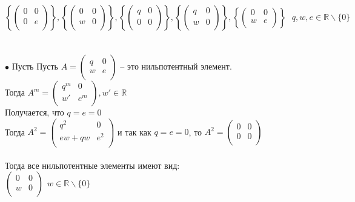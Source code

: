 \documentclass[12pt,a4paper]{scrartcl}
\begin{document}
	$\left\{ \begin{pmatrix}
	0&0\\
	0&e\\
	\end{pmatrix} \right\}, \left\{ \begin{pmatrix}
	0&0\\
	w&0\\
	\end{pmatrix} \right\}, \left\{ \begin{pmatrix}
	q&0\\
	0&0\\
	\end{pmatrix} \right\}, \left\{ \begin{pmatrix}
	q&0\\
	w&0\\
	\end{pmatrix} \right\}, \left\{ \begin{pmatrix}
	0&0\\
	w&e\\
	\end{pmatrix} \right\}~~~ q, w, e \in \mathbb{R}\backslash \{0\}$\\
	\\
	\\
	$\bullet$ Пусть  Пусть $A = \begin{pmatrix}
	q&0\\
	w&e\\
	\end{pmatrix}$ -- это нильпотентный элемент.\\
	Тогда $A^m = \begin{pmatrix}
	q^m&0\\
	w'&e^m\\
	\end{pmatrix}, w' \in \mathbb{R}$\\
	Получается, что $q = e = 0$\\
	Тогда $A^2 = \begin{pmatrix}
	q^2&0\\
	ew + qw&e^2\\
	\end{pmatrix}$ и так как $q = e = 0$, то $A^2 = \begin{pmatrix}
	0&0\\
	0&0\\
	\end{pmatrix}$\\
	\\
	Тогда все нильпотентные элементы имеют вид:\\
	$\begin{pmatrix}
	0&0\\
	w&0\\
	\end{pmatrix}~~w \in \mathbb{R} \backslash \{0\}$
\end{document}
